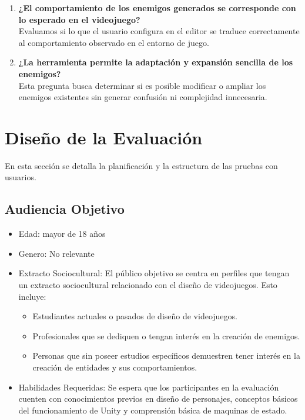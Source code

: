 \begin{description}
\begin{enumerate}
		\item \textbf{¿El comportamiento de los enemigos generados se corresponde con lo esperado en el videojuego?}\\
 Evaluamos si lo que el usuario configura en el editor se traduce correctamente al comportamiento observado en el entorno de juego.

		\item \textbf{¿La herramienta permite la adaptación y expansión sencilla de los enemigos?}\\
 Esta pregunta busca determinar si es posible modificar o ampliar los enemigos existentes sin generar confusión ni complejidad innecesaria.
	\end{enumerate}
\end{description}

\section{Diseño de la Evaluación}
En esta sección se detalla la planificación y la estructura de las pruebas con usuarios.

\subsection{Audiencia Objetivo}
\begin{itemize}
\item Edad: mayor de 18 años
\item Genero: No relevante
\item Extracto Sociocultural: El público objetivo se centra en perfiles que tengan un extracto sociocultural relacionado con el diseño de videojuegos. Esto incluye:
\begin{itemize}
\item Estudiantes actuales o pasados de diseño de videojuegos.
\item Profesionales que se dediquen o tengan interés en la creación de enemigos.
\item Personas que sin poseer estudios específicos demuestren tener interés en la creación de entidades y sus comportamientos. 
\end{itemize}

\item Habilidades Requeridas:  Se espera que los participantes en la evaluación cuenten con conocimientos previos en diseño de personajes, conceptos básicos del funcionamiento de Unity y comprensión básica de maquinas de estado.
\end{itemize}

